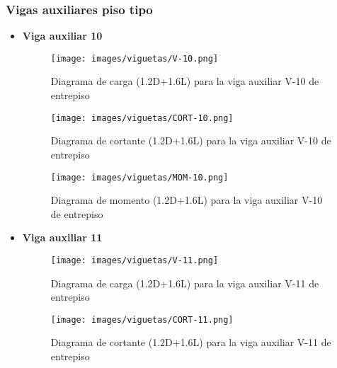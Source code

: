 \subsubsection{Vigas auxiliares piso tipo}
\begin{itemize}
        \item \textbf{Viga auxiliar 10}\\
            \begin{figure}[H]
                \centering
                \texttt{[image: images/viguetas/V-10.png]}
                \caption{Diagrama de carga (1.2D+1.6L) para la viga auxiliar V-10 de entrepiso}
                \label{fig:W V-10 EP}
            \end{figure}
            
            \begin{figure}[H]
                \centering
                \texttt{[image: images/viguetas/CORT-10.png]}
                \caption{Diagrama de cortante (1.2D+1.6L) para la viga auxiliar V-10 de entrepiso}
                \label{fig:Cort V-10 EP}
            \end{figure}
            
            \begin{figure}[H]
                \centering
                \texttt{[image: images/viguetas/MOM-10.png]}
                \caption{Diagrama de momento (1.2D+1.6L) para la viga auxiliar V-10 de entrepiso}
                \label{fig:MOm V-10 EP}
            \end{figure}
            
            \item \textbf{Viga auxiliar 11}\\
            \begin{figure}[H]
                \centering
                \texttt{[image: images/viguetas/V-11.png]}
                \caption{Diagrama de carga (1.2D+1.6L) para la viga auxiliar V-11 de entrepiso}
                \label{fig:W V-11 EP}
            \end{figure}
            
            \begin{figure}[H]
                \centering
                \texttt{[image: images/viguetas/CORT-11.png]}
                \caption{Diagrama de cortante (1.2D+1.6L) para la viga auxiliar V-11 de entrepiso}
                \label{fig:Cort V-11 EP}
            \end{figure}
            

\end{itemize}
